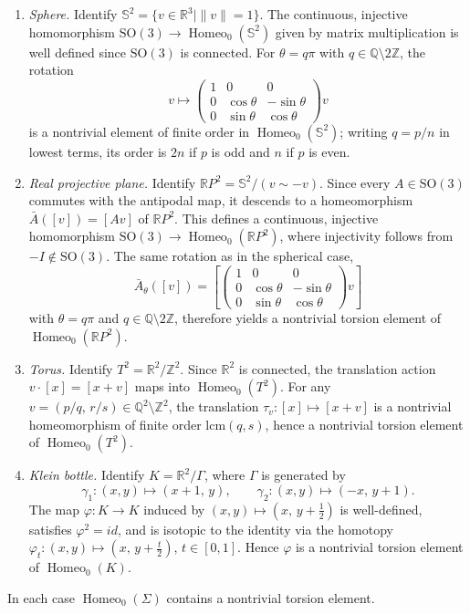 \documentclass[12pt,a4paper]{amsart}
\numberwithin{equation}{section}
\DeclareMathOperator{\Homeo}{Homeo}
\theoremstyle{plain}
\theoremstyle{definition}
\theoremstyle{remark}
\begin{document}
\begin{enumerate}
    \item \textit{Sphere.} Identify $\mathbb{S}^2 = \{v \in \mathbb{R}^3 \mid \|v\| = 1\}$.
    The continuous, injective homomorphism $\mathrm{SO}(3) \to \Homeo_0(\mathbb{S}^2)$ given
    by matrix multiplication is well defined since $\mathrm{SO}(3)$ is connected. For
    $\theta = q\pi$ with $q \in \mathbb{Q} \setminus 2\mathbb{Z}$, the rotation
    \[
        v \mapsto \begin{pmatrix} 1 & 0 & 0 \\ 0 & \cos\theta & -\sin\theta \\
        0 & \sin\theta & \cos\theta \end{pmatrix} v
    \]
    is a nontrivial element of finite order in $\Homeo_0(\mathbb{S}^2)$; writing $q = p/n$
    in lowest terms, its order is $2n$ if $p$ is odd and $n$ if $p$ is even.

    \item \textit{Real projective plane.} Identify $\mathbb{R}P^2 = \mathbb{S}^2/(v \sim -v)$.
    Since every $A \in \mathrm{SO}(3)$ commutes with the antipodal map, it descends to a
    homeomorphism $\bar{A}([v]) = [Av]$ of $\mathbb{R}P^2$. This defines a continuous,
    injective homomorphism $\mathrm{SO}(3) \to \Homeo_0(\mathbb{R}P^2)$, where injectivity
    follows from $-I \notin \mathrm{SO}(3)$. The same rotation as in the spherical case,
    \[
        \bar{A}_\theta([v]) = \left[\begin{pmatrix} 1 & 0 & 0 \\ 0 & \cos\theta & -\sin\theta \\
        0 & \sin\theta & \cos\theta \end{pmatrix} v\right]
    \]
    with $\theta = q\pi$ and $q \in \mathbb{Q} \setminus 2\mathbb{Z}$, therefore yields a
    nontrivial torsion element of $\Homeo_0(\mathbb{R}P^2)$.

    \item \textit{Torus.} Identify $T^2 = \mathbb{R}^2/\mathbb{Z}^2$. Since $\mathbb{R}^2$
    is connected, the translation action $v \cdot [x] = [x+v]$ maps into $\Homeo_0(T^2)$.
    For any $v = (p/q,\, r/s) \in \mathbb{Q}^2 \setminus \mathbb{Z}^2$, the translation
    $\tau_v \colon [x] \mapsto [x+v]$ is a nontrivial homeomorphism of finite order
    $\mathrm{lcm}(q,s)$, hence a nontrivial torsion element of $\Homeo_0(T^2)$.

    \item \textit{Klein bottle.} Identify $K = \mathbb{R}^2/\Gamma$, where $\Gamma$ is
    generated by
    \[
        \gamma_1 \colon (x,y) \mapsto (x+1,\, y), \qquad
        \gamma_2 \colon (x,y) \mapsto (-x,\, y+1).
    \]
    The map $\varphi \colon K \to K$ induced by $(x,y) \mapsto (x,\, y + \frac{1}{2})$
    is well-defined, satisfies $\varphi^2 = id$, and is isotopic to the identity
    via the homotopy $\varphi_t \colon (x,y) \mapsto (x,\, y + \tfrac{t}{2})$, $t \in [0,1]$.
    Hence $\varphi$ is a nontrivial torsion element of $\Homeo_0(K)$.
\end{enumerate}
In each case $\Homeo_0(\Sigma)$ contains a nontrivial torsion element.
\end{document}
